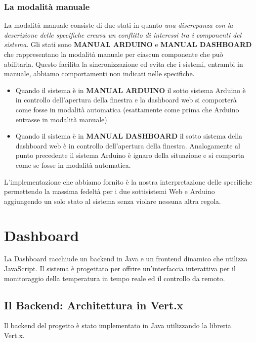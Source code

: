 \documentclass{report}
\begin{document}
\subsection{La modalità manuale}
La modalità manuale consiste di due stati in quanto \textit{una discrepanza con la descrizione delle specifiche creava un conflitto di interessi tra i componenti del sistema}. 
Gli stati sono \textbf{MANUAL ARDUINO} e \textbf{MANUAL DASHBOARD} che rappresentano la modalità manuale per ciascun componente che può abilitarla. Questo facilita la sincronizzazione ed evita che i sistemi, entrambi in manuale, abbiamo comportamenti non indicati nelle specifiche. \\
\begin{itemize}
    \item Quando il sistema è in \textbf{MANUAL ARDUINO} il sotto sistema Arduino è in controllo dell'apertura della finestra e la dashboard web si comporterà come fosse in modalità automatica (esattamente come prima  che Arduino entrasse in modalità manuale)
    \item Quando il sistema è in \textbf{MANUAL DASHBOARD} il sotto sistema della dashboard web è in controllo dell'apertura della finestra. Analogamente al punto precedente il sistema Arduino è ignaro della situazione e si comporta come se fosse in modalità automatica. 
\end{itemize}
L'implementazione che abbiamo fornito è la nostra interpretazione delle specifiche permettendo la massima fedeltà per i due sottisistemi Web e Arduino aggiungendo un solo stato al sistema senza violare nessuna altra regola. 
%
%
\chapter{Dashboard}
\par {
La Dashboard racchiude un backend in Java e un frontend dinamico che utilizza JavaScript. Il sistema è progettato per offrire un’interfaccia interattiva per il monitoraggio della temperatura  in tempo reale ed il controllo da remoto.
}

\section{Il Backend: Architettura in Vert.x}
Il backend del progetto è stato implementato in Java utilizzando la libreria Vert.x.
\end{document}
